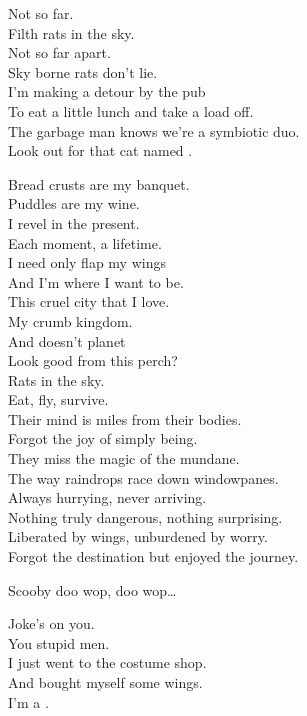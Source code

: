 Not so far. \\
Filth rats in the sky. \\
Not so far apart. \\
Sky borne rats don't lie. \\

I'm making a detour by the pub \\
To eat a little lunch and take a load off. \\
The garbage man knows we're a symbiotic duo. \\
Look out for that cat named . \\


Bread crusts are my banquet. \\
Puddles are my wine. \\
I revel in the present. \\
Each moment, a lifetime. \\
I need only flap my wings \\
And I'm where I want to be. \\

This cruel city that I love. \\
My crumb kingdom. \\
And doesn't planet  \\
Look good from this perch? \\
Rats in the sky. \\
Eat, fly, survive. \\

Their mind is miles from their bodies. \\
Forgot the joy of simply being. \\
They miss the magic of the mundane. \\
The way raindrops race down windowpanes. \\
Always hurrying, never arriving. \\
Nothing truly dangerous, nothing surprising. \\
Liberated by wings, unburdened by worry. \\
Forgot the destination but enjoyed the journey. \\


Scooby doo wop, doo wop…

Joke's on you. \\
You stupid men. \\
I just went to the costume shop. \\
And bought myself some wings. \\
I'm a . \\

